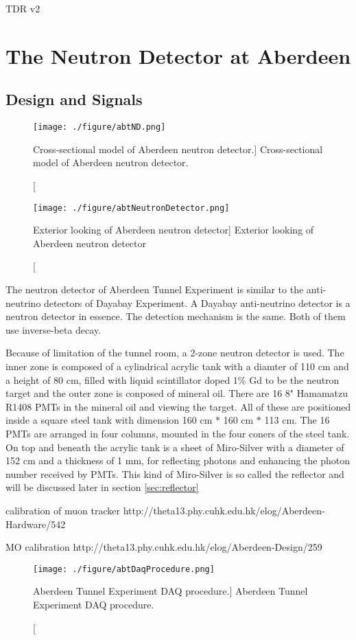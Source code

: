 TDR v2




\section{The Neutron Detector at Aberdeen}
\label{sec:ND}
\subsection{Design and Signals}


\begin{figure}[h]
    \centering
    \texttt{[image: ./figure/abtND.png]}
    \caption
    [Cross-sectional model of Aberdeen neutron detector.]
    {Cross-sectional model of Aberdeen neutron detector.}
    \label{fig:abtND.png}
    \end{figure}

\begin{figure}[h]
    \centering
    \texttt{[image: ./figure/abtNeutronDetector.png]}
    \caption
    [Exterior looking of Aberdeen neutron detector]
    {Exterior looking of Aberdeen neutron detector}
    \label{fig:abtNeutronDetector.png}
    \end{figure}








The neutron detector of Aberdeen Tunnel Experiment is similar to the
anti-neutrino detectors of Dayabay Experiment. A Dayabay anti-neutrino
detector is a neutron detector in essence. The detection mechanism is the same.
Both of them use inverse-beta decay.

Because of limitation of the tunnel room, a 2-zone neutron detector is used. The inner zone
is composed of a cylindrical acrylic tank with a diamter of 110 cm and a height of 80 cm, filled with liquid scintillator doped 1\% Gd to be the neutron target and
the outer zone is conposed of mineral oil. There are 16 8" Hamamatzu R1408 PMTs in the mineral oil and viewing the target.
All of these are positioned inside a square steel tank with dimension 160 cm $*$ 160 cm $*$ 113 cm. The 16 PMTs
are arranged in four columns, mounted in the four coners of the steel tank. On top and beneath the acrylic tank is
a sheet of Miro-Silver with a diameter of 152 cm and a thickness of 1 mm, for reflecting photons and
enhancing the photon number received by PMTs. This kind of Miro-Silver is so called the reflector and will
be discussed later in section \ref{sec:reflector}


calibration of muon tracker
http://theta13.phy.cuhk.edu.hk/elog/Aberdeen-Hardware/542

MO calibration
http://theta13.phy.cuhk.edu.hk/elog/Aberdeen-Design/259



\begin{figure}[h]
    \centering
    \texttt{[image: ./figure/abtDaqProcedure.png]}
    \caption
    [Aberdeen Tunnel Experiment DAQ procedure.]
    {Aberdeen Tunnel Experiment DAQ procedure.}
    \label{fig:abtDaqProcedure.png}
    \end{figure}
